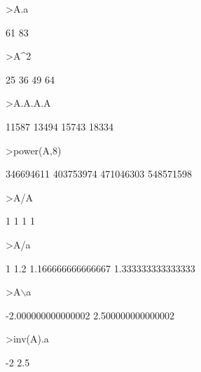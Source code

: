\documentclass[a4paper,10pt]{article}
\begin{document}
\begin{eulernotebook}
\begin{eulercomment}
\begin{eulercomment}
\begin{eulercomment}
\begin{eulercomment}
\begin{eulercomment}
\begin{eulercomment}
\begin{eulercomment}
\begin{eulercomment}
\begin{eulerprompt}
>A.a
\end{eulerprompt}
\begin{euleroutput}
                       61 
                       83 
\end{euleroutput}
\begin{eulerprompt}
>A^2
\end{eulerprompt}
\begin{euleroutput}
                       25                      36 
                       49                      64 
\end{euleroutput}
\begin{eulerprompt}
>A.A.A.A
\end{eulerprompt}
\begin{euleroutput}
                    11587                   13494 
                    15743                   18334 
\end{euleroutput}
\begin{eulerprompt}
>power(A,8)
\end{eulerprompt}
\begin{euleroutput}
                346694611               403753974 
                471046303               548571598 
\end{euleroutput}
\begin{eulerprompt}
>A/A
\end{eulerprompt}
\begin{euleroutput}
                        1                       1 
                        1                       1 
\end{euleroutput}
\begin{eulerprompt}
>A/a
\end{eulerprompt}
\begin{euleroutput}
                        1                     1.2 
        1.166666666666667       1.333333333333333 
\end{euleroutput}
\begin{eulerprompt}
>A\(\backslash\)a
\end{eulerprompt}
\begin{euleroutput}
       -2.000000000000002 
        2.500000000000002 
\end{euleroutput}
\begin{eulerprompt}
>inv(A).a
\end{eulerprompt}
\begin{euleroutput}
                       -2 
                      2.5 
\end{euleroutput}
\begin{eulerprompt}

\end{eulerprompt}
\end{eulercomment}
\end{eulercomment}
\end{eulercomment}
\end{eulercomment}
\end{eulercomment}
\end{eulercomment}
\end{eulercomment}
\end{eulercomment}
\end{eulernotebook}
\end{document}
